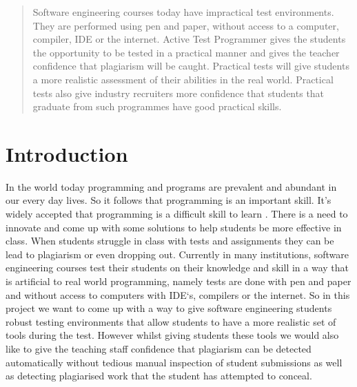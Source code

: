 \documentclass[twocolumn]{article}
\begin{document}


\begin{abstract}

Software engineering courses today have impractical test environments. They are
performed using pen and paper, without access to a computer, compiler, IDE or
the internet. Active Test Programmer gives the students the opportunity to be
tested in a practical manner and gives the teacher confidence that plagiarism
will be caught. Practical tests will give students a more realistic assessment
of their abilities in the real world. Practical tests also give industry
recruiters more confidence that students that graduate from such programmes have
good practical skills. 

\end{abstract}

\section{Introduction}
In the world today programming and programs are prevalent and abundant in our
every day lives. So it follows that programming is an important skill. It's
widely accepted that programming is a difficult skill to learn
\cite{jenkins2002difficulty, robins2003learning}. There is a need to innovate
and come up with some solutions to help students be more effective in class.
When students struggle in class with tests and assignments they can be lead to
plagiarism or even dropping out\cite{bennedsen2007failure}. Currently in many
institutions, software engineering courses test their students on their
knowledge and skill in a way that is artificial to real world programming,
namely tests are done with pen and paper and without access to computers with
IDE`s, compilers or the internet. So in this project we want to come up with a
way to give software engineering students robust testing environments that allow
students to have a more realistic set of tools during the test. However whilst
giving students these tools we would also like to give the teaching staff
confidence that plagiarism can be detected automatically without tedious manual
inspection of student submissions as well as detecting plagiarised work that the
student has attempted to conceal.
\end{document}
